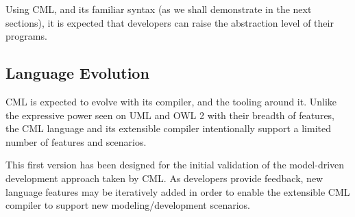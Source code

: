 Using CML,
and its familiar syntax (as we shall demonstrate in the next sections),
it is expected that developers can raise the abstraction level of their programs.

\subsection{Language Evolution}

CML is expected to evolve with its compiler, and the tooling around it.
Unlike the expressive power seen on UML \cite{uml} and OWL 2 \cite{owl2} with their breadth of features,
the CML language and its extensible compiler intentionally support a limited number of features and scenarios.

This first version has been designed for the initial validation of the model-driven development approach taken by CML.
As developers provide feedback,
new language features may be iteratively added in order to enable the extensible CML compiler to support new modeling/development scenarios.

